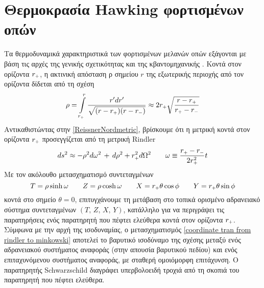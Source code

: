 \section{Θερμοκρασία Hawking φορτισμένων οπών}
Τα θερμοδυναμικά χαρακτηριστικά των φορτισμένων μελανών οπών εξάγονται με βάση τις αρχές της γενικής σχετικότητας και της κβαντομηχανικής \cite{Susskind:2005js}. Κοντά στον ορίζοντα $r\subscr{+}$, η 
ακτινική απόσταση ρ σημείου $r$ της εξωτερικής περιοχής από τον ορίζοντα δίδεται από τη σχέση 
\begin{equation}
    \rho = \int\limits_{r\subscr{+}}^r \frac{r'dr'}{\sqrt{(r-r\subscr{+})(r-r\subscr{-})}}\approx 2r\subscr{+}\sqrt{\frac{r-r\subscr{+}}{r\subscr{+}-r\subscr{-}}}
\end{equation}
Αντικαθιστώντας στην \eqref{ReissnerNordmetric}, βρίσκουμε ότι η μετρική κοντά στον ορίζοντα $r\subscr{+}$ προσεγγίζεται από τη μετρική Rindler
\begin{equation}\label{rindler metric close to horizon}
    ds^2\approx -\rho^2 d\omega^2\,+\,d\rho^2 + r\subscr{+}^2 d\Omega^2 \quad\quad \omega\equiv\frac{r\subscr{+}-r\subscr{-}}{2r\subscr{+}^2}t
\end{equation}
Με τον ακόλουθο μετασχηματισμό συντεταγμένων
\begin{equation}\label{coordinate tran from rindler to minkowski}
    T=\rho\sinh{\omega}\qquad Z=\rho\cosh{\omega}\qquad X=r\subscr{+}\theta\cos\phi \qquad Y=r\subscr{+}\theta\sin\phi
\end{equation}
κοντά στο σημείο $\theta = 0$, επιτυγχάνουμε τη μετάβαση στο τοπικά ορισμένο αδρανειακό σύστημα συντεταγμένων $(T,\,Z,\,X,\,Y)$, κατάλληλο για να περιγράψει τις παρατηρήσεις ενός παρατηρητή που πέφτει ελεύθερα κοντά στον ορίζοντα $r\subscr{+}$. 
Σύμφωνα με την αρχή της ισοδυναμίας, ο μετασχηματισμός \eqref{coordinate tran from rindler to minkowski} αποτελεί το βαρυτικό ισοδύναμο της σχέσης μεταξύ ενός αδρανειακού συστήματος αναφοράς (στην απουσία βαρυτικού πεδίου) και ενός επιταχυνόμενου συστήματος αναφοράς, με σταθερή ομοιόμορφη επιτάχυνση. Ο παρατηρητής Schwarzschild διαγράφει υπερβολοειδή τροχιά από τη σκοπιά του παρατηρητή που πέφτει ελεύθερα.\\ 

